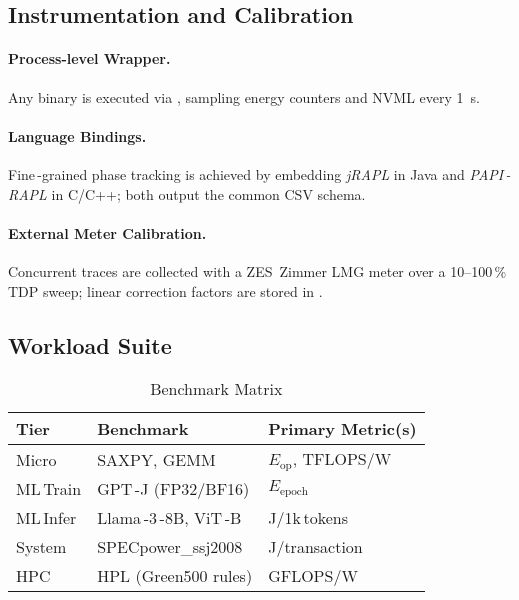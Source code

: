 \subsection{Instrumentation and Calibration}
\label{sec:energy:instr}



\paragraph{Process-level Wrapper.} Any binary is executed via , sampling \sysfs energy counters and NVML every \SI{1}{\second}.

\paragraph{Language Bindings.} Fine\,-grained phase tracking is achieved by embedding \emph{jRAPL} in Java and \emph{PAPI\,-RAPL} in C/C++; both output the common CSV schema.

\paragraph{External Meter Calibration.} Concurrent traces are collected with a ZES~Zimmer LMG meter over a 10–100\,\% TDP sweep; linear correction factors are stored in .


\subsection{Workload Suite}
\label{sec:energy:workload}



\begin{table}[tb]
\centering
\caption{Benchmark Matrix}
\begin{tabular}{lll}
\toprule
\textbf{Tier} & \textbf{Benchmark} & \textbf{Primary Metric(s)} \\
\midrule
Micro   & SAXPY, GEMM            & $E_{\text{op}}$, TFLOPS/W \\
ML\,Train & GPT\,-J (FP32/BF16)    & $E_{\text{epoch}}$ \\
ML\,Infer & Llama\,-3\,-8B, ViT\,-B & J/1k\,tokens \\
System  & SPECpower\_ssj2008     & J/transaction \\
HPC     & HPL (Green500 rules)   & GFLOPS/W \\
\bottomrule
\end{tabular}
\label{tab:benchmark_matrix}
\end{table}

